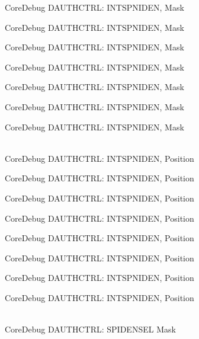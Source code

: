 \begin{DoxyRefList}
\label{deprecated__deprecated000140}%
%
Core\+Debug DAUTHCTRL:\+ INTSPNIDEN, Mask 

\label{deprecated__deprecated000216}%
%
Core\+Debug DAUTHCTRL:\+ INTSPNIDEN, Mask 

\label{deprecated__deprecated000279}%
%
Core\+Debug DAUTHCTRL:\+ INTSPNIDEN, Mask 

\label{deprecated__deprecated000358}%
%
Core\+Debug DAUTHCTRL:\+ INTSPNIDEN, Mask 

\label{deprecated__deprecated000434}%
%
Core\+Debug DAUTHCTRL:\+ INTSPNIDEN, Mask 

\label{deprecated__deprecated000537}%
%
Core\+Debug DAUTHCTRL:\+ INTSPNIDEN, Mask 

\label{deprecated__deprecated000639}%
%
Core\+Debug DAUTHCTRL:\+ INTSPNIDEN, Mask  
\item[{\parbox[t]{\linewidth}{Global \doxylink{group__CMSIS__SCB_gaf733a36e6b4717a604f7d77c05dfceb4}{Core\+Debug\+\_\+\+DAUTHCTRL\+\_\+\+INTSPNIDEN\+\_\+\+Pos} }}]\hfill \\
\label{deprecated__deprecated000085}%
%
Core\+Debug DAUTHCTRL:\+ INTSPNIDEN, Position 

\label{deprecated__deprecated000139}%
%
Core\+Debug DAUTHCTRL:\+ INTSPNIDEN, Position 

\label{deprecated__deprecated000215}%
%
Core\+Debug DAUTHCTRL:\+ INTSPNIDEN, Position 

\label{deprecated__deprecated000278}%
%
Core\+Debug DAUTHCTRL:\+ INTSPNIDEN, Position 

\label{deprecated__deprecated000357}%
%
Core\+Debug DAUTHCTRL:\+ INTSPNIDEN, Position 

\label{deprecated__deprecated000433}%
%
Core\+Debug DAUTHCTRL:\+ INTSPNIDEN, Position 

\label{deprecated__deprecated000536}%
%
Core\+Debug DAUTHCTRL:\+ INTSPNIDEN, Position 

\label{deprecated__deprecated000638}%
%
Core\+Debug DAUTHCTRL:\+ INTSPNIDEN, Position  
\item[{\parbox[t]{\linewidth}{Global \doxylink{group__CMSIS__SCB_gaa043fd13768d57be320c682ca1c9b234}{Core\+Debug\+\_\+\+DAUTHCTRL\+\_\+\+SPIDENSEL\+\_\+\+Msk} }}]\hfill \\
\label{deprecated__deprecated000092}%
%
Core\+Debug DAUTHCTRL:\+ SPIDENSEL Mask 


\end{DoxyRefList}
